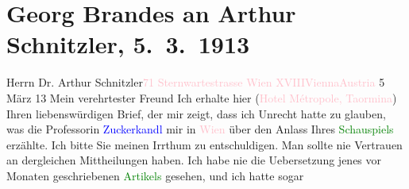 

               \section[Georg Brandes an Arthur Schnitzler, 5. 3. 1913]{ Georg Brandes an Arthur Schnitzler, 5. 3. 1913}\nopagebreak{}\rehead{ }\normalsize\beginnumbering{} \toendnotes[C]{\smallbreak\pagebreak[2]} 
\toendnotes[C]{\smallbreak}\pstart{}{\pb}Herrn Dr. Arthur
                        Schnitzler\pend{}\pstart{}\textcolor{pink}{71 Sternwartestrasse Wien XVIII}{}\ledrightnote{\textcolor{pink}{Sternwartestraße}}\pend{}\pstart{}\textcolor{pink}{Vienna}{}\ledrightnote{\textcolor{pink}{Wien}}\pend{}\pstart{}\textcolor{pink}{Austria}{}\ledrightnote{\textcolor{pink}{Österreich}}\pend{}{\bigskip}\pstart
           \raggedleft{}{\pb}5 März 13\pend
           \pstart{}Mein verehrtester Freund\pend\pstart
           Ich erhalte hier (\textcolor{pink}{Hotel Métropole, Taormina}{}\ledrightnote{\textcolor{pink}{Grand Hotel Metropol}})
                    Ihren liebenswürdigen Brief, der mir zeigt, dass ich Unrecht hatte zu glauben,
                    was die Professorin \textcolor{blue}{Zuckerkandl}{}\ledrightnote{\textcolor{blue}{Berta Zuckerkandl}} mir in \textcolor{pink}{Wien}{}\ledrightnote{\textcolor{pink}{Wien}} über den Anlass Ihres \textcolor{green}{Schauspiels}{} erzählte. Ich bitte Sie
                    meinen Irrthum zu entschuldigen. Man sollte nie Vertrauen an dergleichen
                    Mittheilungen haben.\pend
           \pstart
           Ich habe nie die Uebersetzung jenes vor Monaten geschriebenen \textcolor{green}{Artikels}{} gesehen, und ich hatte sogar
